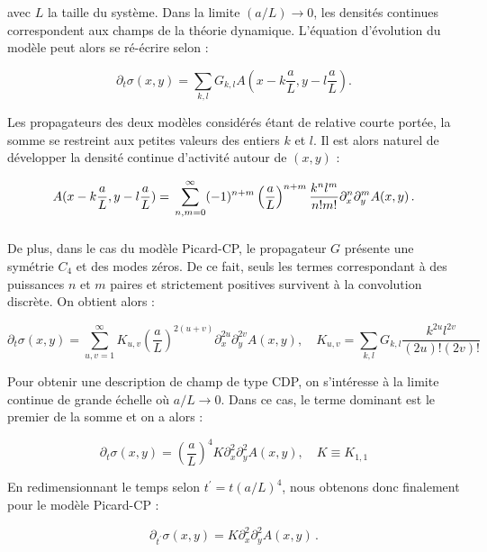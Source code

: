 \noindent avec $L$ la taille du système. Dans la limite $(a/L) \rightarrow 0$, les densités continues correspondent aux champs de la théorie dynamique. L'équation d'évolution du modèle peut alors se ré-écrire selon :

\begin{equation}
    \partial_t\sigma (x,y) = \sum_{k,l}G_{k,l}A(x-k\frac{a}{L}, y-l\frac{a}{L}).
    \label{eq:2}
\end{equation}

\noindent Les propagateurs des deux modèles considérés étant de relative courte portée, la somme se restreint aux petites valeurs des entiers $k$ et $l$. Il est alors naturel de développer la densité continue d'activité autour de $(x,y)$ :

\begin{equation}
    A(x-k\frac{a}{L}, y-l\frac{a}{L}) = \\ \sum_{n,m=0}^{\infty}(-1)^{n+m}\left( \frac{a}{L} \right)^{n+m}\frac{k^nl^m}{n!m!}\partial_x^n\partial_y^mA(x, y)\, .
\end{equation}

\subparagraph{}De plus, dans le cas du modèle Picard-CP, le propagateur $G$ présente une symétrie $C_4$ et des modes zéros. De ce fait, seuls les termes correspondant à des puissances $n$ et $m$ paires et strictement positives survivent à la convolution discrète. On obtient alors :

\begin{equation}
    \partial_t\sigma (x,y) = \sum_{u,v=1}^{\infty}K_{u,v}\left( \frac{a}{L} \right)^{2(u+v)}\partial_x^{2u}\partial_y^{2v}A(x, y), \quad K_{u,v} = \sum_{k,l}G_{k,l}\frac{k^{2u}l^{2v}}{(2u)!(2v)!}
\label{eq:3}
\end{equation}

\noindent Pour obtenir une description de champ de type CDP, on s'intéresse à la limite continue de grande échelle où $a/L\rightarrow 0$. Dans ce cas, le terme dominant est le premier de la somme et on a alors :

\begin{equation}
    \partial_t\sigma (x,y) = \left( \frac{a}{L} \right)^{4}K\partial_x^{2}\partial_y^{2}A(x, y), \quad K \equiv K_{1,1}
    \label{eq:evol:sigma:CDP0:raw}
\end{equation}

\noindent En redimensionnant le temps selon $t^\prime=t(a/L)^4$, nous obtenons donc finalement pour le modèle Picard-CP :

\begin{equation}
    \partial_{t^\prime}\sigma (x,y) = K\partial_x^{2}\partial_y^{2}A(x, y)\, .
    \label{eq:evol:sigma:CDP0}
\end{equation}

